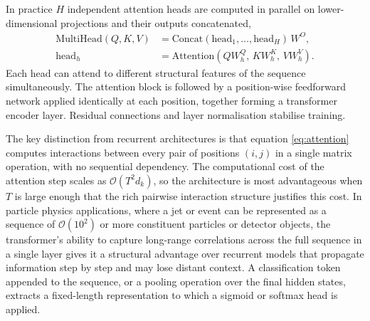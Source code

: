 In practice $H$ independent attention heads are computed in parallel on lower-dimensional projections and their outputs concatenated,
\begin{equation}
\begin{aligned}
\mathrm{MultiHead}(Q,K,V) &= \mathrm{Concat}(\mathrm{head}_1,\dots,\mathrm{head}_H)\,W^{O}, \\
\mathrm{head}_h &= \mathrm{Attention}(QW_h^Q,\,KW_h^K,\,VW_h^V).
\end{aligned}
\end{equation}
Each head can attend to different structural features of the sequence simultaneously.  The attention block is followed by a position-wise feedforward network applied identically at each position, together forming a transformer encoder layer.  Residual connections and layer normalisation \cite{Ba_LayerNorm_2016} stabilise training.

The key distinction from recurrent architectures is that equation \eqref{eq:attention} computes interactions between every pair of positions $(i,j)$ in a single matrix operation, with no sequential dependency.  The computational cost of the attention step scales as $\mathcal{O}(T^{2}d_{k})$, so the architecture is most advantageous when $T$ is large enough that the rich pairwise interaction structure justifies this cost.  In particle physics applications, where a jet or event can be represented as a sequence of $\mathcal{O}(10^2)$ or more constituent particles or detector objects, the transformer's ability to capture long-range correlations across the full sequence in a single layer gives it a structural advantage over recurrent models that propagate information step by step and may lose distant context.  A classification token appended to the sequence, or a pooling operation over the final hidden states, extracts a fixed-length representation to which a sigmoid or softmax head is applied.